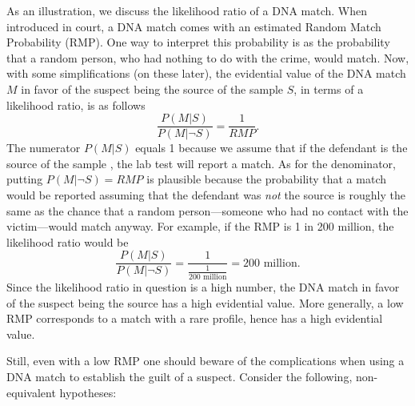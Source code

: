 \documentclass[10pt]{article}
\begin{document}
As an illustration, we discuss the likelihood ratio 
of a DNA match. %
When introduced in court, a DNA match comes with an 
estimated Random Match Probability (RMP).  One way to interpret this probability is 
as the probability that a random person, who 
had nothing to do with the crime, would match. %
%
Now, with some simplifications (on these later), 
the evidential value of the DNA 
match $M$ in favor of the suspect being the source of the sample $S$, in terms of a likelihood ratio, 
is as follows %
%
\[
\frac{P(M | S)}{P(M | \neg S)} =   \frac{1}{RMP}.
\]
%
The numerator $P(M | S)$ equals 1 because we assume that %
if the defendant is the source of the sample%
, the lab test will report a match. As for the denominator, 
putting $P(M | \neg S)=RMP$ is plausible because the probability that a match would be reported assuming that the defendant was \textit{not} 
the source is roughly the same as the chance that a random person---someone who had no contact with the victim---would match anyway. 
For example, if the RMP is 1 in 200 million, the likelihood ratio would be
%
\[\frac{P(M |S)}{P( M | \neg S)}=\frac{1}{\frac{1}{\text{200 million}}}=\text{200 million}.\]
%
Since the likelihood ratio in question is a high number, the DNA match in favor of the suspect being the source
has a high evidential value. More generally, a low RMP corresponds to a match with a rare profile, hence has a high evidential value. 

Still, even with a low RMP one should beware of the complications when using a DNA match to establish the guilt of a suspect. Consider the following, non-equivalent hypotheses: %
\end{document}

